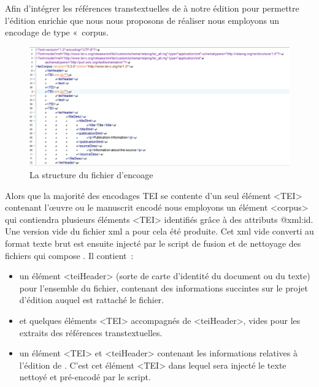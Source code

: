 Afin d'intégrer les références transtextuelles de \punr{} à notre édition pour permettre l'édition enrichie que nous nous proposons de réaliser nous employons un encodage de type «~corpus\gf. 
\begin{figure}[H]
    \centering
    \includegraphics[scale=0.5]{img/screen_itei_corpus.jpg}
    \caption{La structure du fichier d'encoage}
    \label{fig:screen_tei_corpus}
\end{figure}
Alors que la majorité des encodages TEI se contente d'un seul élément <TEI> contenant l'œuvre ou le manuscrit encodé nous employons un élément <corpus> qui contiendra plusieurs éléments <TEI> identifiés grâce à des attributs @xml\NoAutoSpaceBeforeFDP:id. Une version vide du fichier xml a pour cela été produite. Cet xml vide converti au format texte brut est ensuite injecté par le script de fusion et de nettoyage des fichiers qui compose \punr. Il contient~:
\begin{itemize}
    \item un élément <teiHeader> (sorte de carte d'identité du document ou du texte) pour l'ensemble du fichier, contenant des informations succintes sur le projet d'édition auquel est rattaché le fichier.
    \item et quelques éléments <TEI> accompagnés de <teiHeader>, vides pour les extraits des références transtextuelles.
    \item un élément <TEI> et <teiHeader> contenant les informations relatives à l'édition de \punr. C'est cet élément <TEI> dans lequel sera injecté le texte nettoyé et pré-encodé par le script.
\end{itemize}

